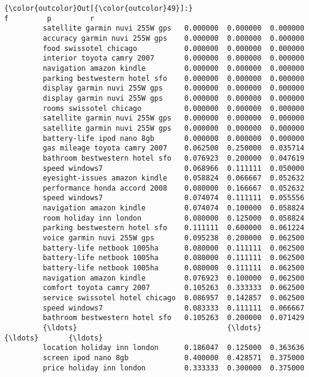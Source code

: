 \documentclass[11pt]{article}
\begin{document}
\begin{Verbatim}[commandchars=\\\{\}]
{\color{outcolor}Out[{\color{outcolor}49}]:}                                         f         p         r
         satellite garmin nuvi 255W gps   0.000000  0.000000  0.000000
         accuracy garmin nuvi 255W gps    0.000000  0.000000  0.000000
         food swissotel chicago           0.000000  0.000000  0.000000
         interior toyota camry 2007       0.000000  0.000000  0.000000
         navigation amazon kindle         0.000000  0.000000  0.000000
         parking bestwestern hotel sfo    0.000000  0.000000  0.000000
         display garmin nuvi 255W gps     0.000000  0.000000  0.000000
         display garmin nuvi 255W gps     0.000000  0.000000  0.000000
         rooms swissotel chicago          0.000000  0.000000  0.000000
         satellite garmin nuvi 255W gps   0.000000  0.000000  0.000000
         satellite garmin nuvi 255W gps   0.000000  0.000000  0.000000
         battery-life ipod nano 8gb       0.000000  0.000000  0.000000
         gas mileage toyota camry 2007    0.062500  0.250000  0.035714
         bathroom bestwestern hotel sfo   0.076923  0.200000  0.047619
         speed windows7                   0.068966  0.111111  0.050000
         eyesight-issues amazon kindle    0.058824  0.066667  0.052632
         performance honda accord 2008    0.080000  0.166667  0.052632
         speed windows7                   0.074074  0.111111  0.055556
         navigation amazon kindle         0.074074  0.100000  0.058824
         room holiday inn london          0.080000  0.125000  0.058824
         parking bestwestern hotel sfo    0.111111  0.600000  0.061224
         voice garmin nuvi 255W gps       0.095238  0.200000  0.062500
         battery-life netbook 1005ha      0.080000  0.111111  0.062500
         battery-life netbook 1005ha      0.080000  0.111111  0.062500
         battery-life netbook 1005ha      0.080000  0.111111  0.062500
         navigation amazon kindle         0.076923  0.100000  0.062500
         comfort toyota camry 2007        0.105263  0.333333  0.062500
         service swissotel hotel chicago  0.086957  0.142857  0.062500
         speed windows7                   0.083333  0.111111  0.066667
         bathroom bestwestern hotel sfo   0.105263  0.200000  0.071429
         {\ldots}                                   {\ldots}       {\ldots}       {\ldots}
         location holiday inn london      0.186047  0.125000  0.363636
         screen ipod nano 8gb             0.400000  0.428571  0.375000
         price holiday inn london         0.333333  0.300000  0.375000

\end{Verbatim}
\end{document}
